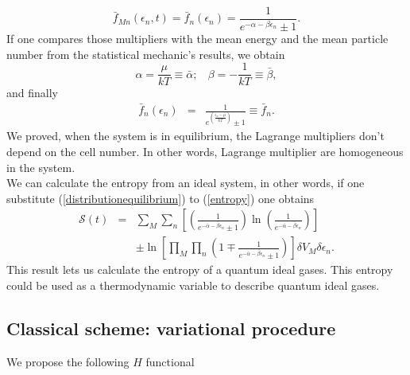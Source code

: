 \documentclass{article}
\newcommand{\de}{\delta}
\newcommand{\Ss}{\mathcal{S}}
\begin{document}
\begin{equation}
    \bar f_{Mn}(\epsilon_{n},t)=\bar f_n(\epsilon_{n}) =\frac{1}{e^{-\alpha-\beta \epsilon_n}\pm 1}.
\end{equation}{}
If one compares those multipliers with the mean energy and the mean particle number from the statistical mechanic's results, we obtain
\begin{equation}
    \alpha=\frac{\mu}{kT}\equiv \bar{\alpha}; \ \ \ \ \beta=-\frac{1}{kT}\equiv \bar{\beta},
\end{equation}{}
and finally
\begin{eqnarray}
    \bar{f}_{n}(\epsilon_{n})&=&\frac{1}{e^{(\frac{{\epsilon_n}-\bar{\mu}}{kT})}\pm 1}\equiv \bar{f}_{n}.
\end{eqnarray}{}
We proved, when the system is in equilibrium, the Lagrange multipliers don't depend on the cell number. In other words, Lagrange multiplier are homogeneous in the system.\\
We can calculate the entropy from an ideal system, in other words, if one substitute (\ref{distributionequilibrium}) to (\ref{entropy}) one obtains
\begin{eqnarray}
      \Ss(t)&=&\sum_M \sum_n  \left[\left(\frac{1}{e^{-\bar{\alpha}-\bar{\beta}\epsilon_{n}}\pm 1} \right)\ln \left(\frac{1}{e^{-\bar{\alpha}-\bar{\beta}\epsilon_{n}}} \right) \right]\nonumber \\
      &&\pm  \ln \left[\prod_{M} \prod_{n}\left(1 \mp \frac{1}{e^{-\bar{\alpha}-\bar{\beta}\epsilon_{n}}\pm 1} \right) \right] \de V_M \delta \epsilon_n\label{H-entropy}.
  \end{eqnarray}
  This result lets us calculate the entropy of a quantum ideal gases. This entropy could be used as a thermodynamic variable to describe quantum ideal gases.
\subsection{Classical scheme: variational procedure}
We propose the following $H$ functional
\end{document}
